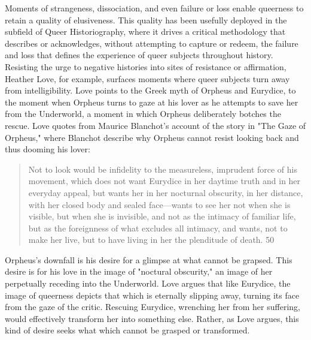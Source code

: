\documentclass[11pt]{article}
\begin{document}
Moments of strangeness, dissociation, and even failure or loss enable
queerness to retain a quality of elusiveness. This quality has been
usefully deployed in the subfield of Queer Historiography, where it
drives a critical methodology that describes or acknowledges, without
attempting to capture or redeem, the failure and loss that defines the
experience of queer subjects throughout history. Resisting the urge to
negative histories into sites of resistance or affirmation, Heather
Love, for example, surfaces moments where queer subjects turn away
from intelligibility. Love points to the Greek myth of Orpheus and
Eurydice, to the moment when Orpheus turns to gaze at his lover as he
attempts to save her from the Underworld, a moment in which Orpheus
deliberately botches the rescue. Love quotes from Maurice Blanchot's
account of the story in "The Gaze of Orpheus," where Blanchot describe
why Orpheus cannot resist looking back and thus dooming his lover:
\begin{quote}
Not to look would be infidelity to the measureless, imprudent force
of his movement, which does not want Eurydice in her daytime truth and
in her everyday appeal, but wants her in her nocturnal obscurity, in
her distance, with her closed body and sealed face---wants to see her
not when she is visible, but when she is invisible, and not as the
intimacy of familiar life, but as the foreignness of what excludes all
intimacy, and wants, not to make her live, but to have living in her
the plenditude of death. 50
\end{quote}
Orpheus's downfall is his desire for a glimpse at what cannot be
grapsed. This desire is for his love in the image of "noctural
obscurity," an image of her perpetually receding into the
Underworld. Love argues that like Eurydice, the image of queerness
depicts that which is eternally slipping away, turning its face from
the gaze of the critic. Rescuing Eurydice, wrenching her from her
suffering, would effectively transform her into something
else. Rather, as Love argues, this kind of desire seeks what which
cannot be grasped or transformed.
\end{document}
